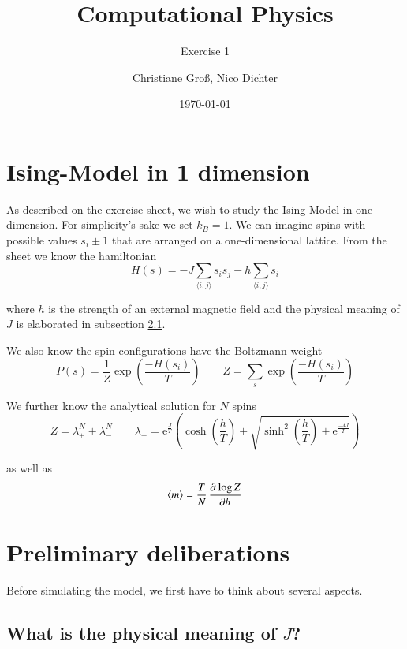 \documentclass{scrartcl}
\title{Computational Physics}
\subtitle{Exercise 1}
\date{\today}
\author{Christiane Groß, Nico Dichter}
\begin{document}
	\maketitle

\section{Ising-Model in 1 dimension}
As described on the exercise sheet, we wish to study the Ising-Model in one dimension. For simplicity's sake we set $k_B=1$. We can imagine spins with possible values $s_i\pm1$ that are arranged on a one-dimensional lattice. From the sheet we know the hamiltonian
\begin{equation}
	H(s)=-J\sum_{\langle i,j\rangle }s_is_j-h\sum_{\langle i,j\rangle }s_i
	\label{eq:hamiltonianising}
\end{equation}

where $h$ is the strength of an external magnetic field and the physical meaning of $J$ is elaborated in subsection \ref{subsec:meaningJ}. 

We also know the spin configurations have the Boltzmann-weight \begin{equation}
P(s)=\frac{1}{Z}\exp\left( \frac{-H(s_i)}{T}\right) 
\qquad
Z=\sum_{s}\exp\left( \frac{-H(s_i)}{T}\right) 
\label{eq:boltzmann}
\end{equation}

We further know the analytical solution for $N$ spins
\begin{equation}
Z=\lambda_+^N+\lambda_-^N \qquad 
\lambda_{\pm}=\text{e}^{\frac{J}{T}}
\left( \cosh\left(\frac{h}{T} \right) \pm \sqrt{\sinh^2\left(\frac{h}{T} \right)+\text{e}^{\frac{-4J}{T}} }\right) 
\label{eq:zanalytical}  
\end{equation}

as well as 
\begin{equation}
\langle m\rangle =\frac{T}{N}\dpd{\log Z}{h}
\label{eq:manalytical}  
\end{equation}

\section{Preliminary deliberations}

Before simulating the model, we first have to think about several aspects.
	
\subsection{What is the physical meaning of $J$?}
\label{subsec:meaningJ}
\end{document}
